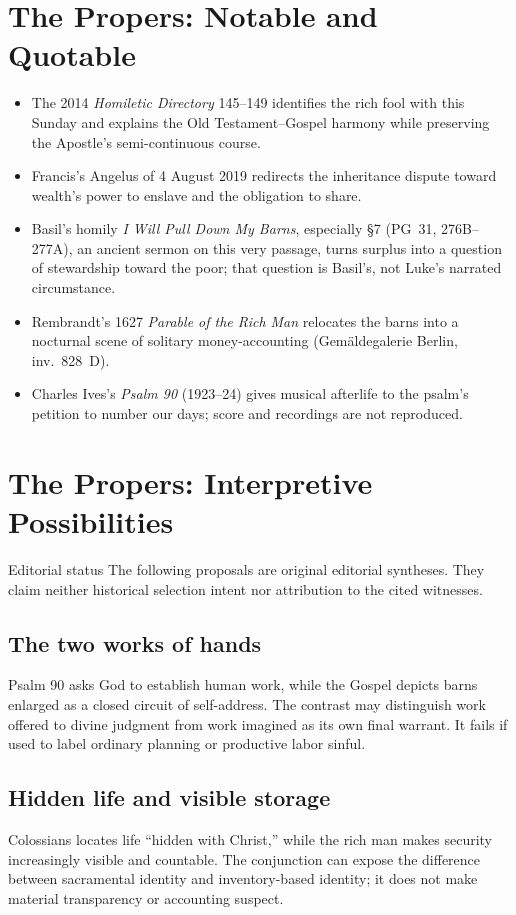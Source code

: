 \section*{The Propers: Notable and Quotable}
\begin{itemize}
\item The 2014 \emph{Homiletic Directory} 145--149 identifies the rich fool
with this Sunday and explains the Old Testament--Gospel harmony while
preserving the Apostle's semi-continuous course.
\item Francis's Angelus of 4 August 2019 redirects the inheritance dispute
toward wealth's power to enslave and the obligation to share.
\item Basil's homily \emph{I Will Pull Down My Barns}, especially §7
(PG~31, 276B--277A), an ancient sermon on this very passage, turns surplus
into a question of stewardship toward the poor; that question is Basil's, not
Luke's narrated circumstance.
\item Rembrandt's 1627 \emph{Parable of the Rich Man} relocates the barns into
a nocturnal scene of solitary money-accounting (Gemäldegalerie Berlin,
inv.~828~D).
\item Charles Ives's \emph{Psalm 90} (1923--24) gives musical afterlife to
the psalm's petition to number our days; score and recordings are not
reproduced.
\end{itemize}

\section*{The Propers: Interpretive Possibilities}
\begin{studybox}{Editorial status}
The following proposals are original editorial syntheses. They claim neither
historical selection intent nor attribution to the cited witnesses.
\end{studybox}
\subsection*{The two works of hands}
Psalm 90 asks God to establish human work, while the Gospel depicts barns
enlarged as a closed circuit of self-address. The contrast may distinguish
work offered to divine judgment from work imagined as its own final warrant.
It fails if used to label ordinary planning or productive labor sinful.
\subsection*{Hidden life and visible storage}
Colossians locates life ``hidden with Christ,'' while the rich man makes
security increasingly visible and countable. The conjunction can expose the
difference between sacramental identity and inventory-based identity; it does
not make material transparency or accounting suspect.
